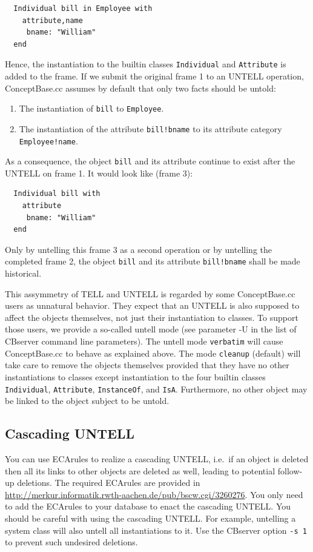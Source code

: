 \begin{verbatim}
  Individual bill in Employee with
    attribute,name
     bname: "William"
  end
\end{verbatim}

Hence, the instantiation to the builtin classes {\tt Individual} and 
{\tt Attribute} is added to the frame. If we submit the original
frame 1 to an UNTELL operation, ConceptBase.cc assumes by default that only two facts should be untold:

\begin{enumerate}
\item The instantiation of {\tt bill} to {\tt Employee}.
\item The instantiation of the attribute {\tt bill!bname} to its attribute category {\tt Employee!name}.
\end{enumerate}

As a consequence, the object {\tt bill} and its attribute continue to exist after the UNTELL on frame 1.
It would look like (frame 3):

\begin{verbatim}
  Individual bill with
    attribute
     bname: "William"
  end
\end{verbatim}

Only by untelling this frame 3 as a second operation or by untelling the completed frame 2, the
object {\tt bill} and its attribute {\tt bill!bname} shall be made historical.

This assymmetry of TELL and UNTELL is regarded by some ConceptBase.cc users as unnatural behavior.
They expect that an UNTELL is also supposed to affect the objects themselves, not just their
instantiation to classes. To support those users, we provide a so-called untell mode (see parameter
-U in the list of CBserver command line parameters). The untell mode {\tt verbatim} will cause
ConceptBase.cc to behave as explained above. 
The mode {\tt cleanup} (default) will take care to remove the objects themselves
provided that they have no other instantiations to classes except instantiation to the four
builtin classes {\tt Individual}, {\tt Attribute}, {\tt InstanceOf}, and {\tt IsA}. Furthermore,
no other object may be linked to the object subject to be untold. 

\subsection{Cascading UNTELL}
\label{sec:cascuntell}

You can use ECArules to realize a cascading UNTELL, i.e.\  if an object is deleted then
all its links to other objects are deleted as well, leading to potential follow-up deletions.
The required ECArules are provided in 
\url{http://merkur.informatik.rwth-aachen.de/pub/bscw.cgi/3260276}.
You only need to add the ECArules to your database to enact the cascading UNTELL.
You should be careful with using the cascading UNTELL. For example, untelling
a system class will also untell all instantiations to it. Use the CBserver
option {\tt -s 1} to prevent such undesired deletions.

